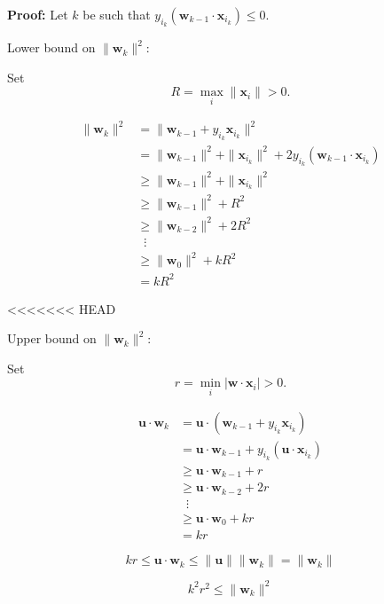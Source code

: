 \documentclass{beamer}
\newcommand{\vu}{\boldsymbol{u}}
\newcommand{\vw}{\boldsymbol{w}}
\newcommand{\vx}{\boldsymbol{x}}
\begin{document}
\begin{frame}{}
    \textbf{Proof:} Let $k$ be such that $y_{i_k}(\vw_{k-1}\cdot\vx_{i_k})\leq 0$.

    Lower bound on $\|\vw_k\|^2$:

    Set
    \[
        R = \max_i\|\vx_i\|>0.
    \]

    \vspace{-2em}\begin{align*}
        \|\vw_k\|^2 &= \|\vw_{k-1} + y_{i_k}\vx_{i_k}\|^2\\
        &= \|\vw_{k-1}\|^2 + \|\vx_{i_k}\|^2 + 2y_{i_k}(\vw_{k-1}\cdot\vx_{i_k})\\
        &\geq \|\vw_{k-1}\|^2 + \|\vx_{i_k}\|^2\\
        &\geq \|\vw_{k-1}\|^2 + R^2\\
        &\geq \|\vw_{k-2}\|^2 + 2R^2\\
        &\;\;\vdots\\
        &\geq \|\vw_0\|^2 + kR^2\\
        &= kR^2
    \end{align*}
\end{frame}

<<<<<<< HEAD
\begin{frame}{}
    Upper bound on $\|\vw_k\|^2$:
 
    Set
    \[
        r = \min_i |\vw\cdot \vx_i|>0.
    \]

    \vspace{-2em}\begin{align*}
        \vu\cdot \vw_k &= \vu\cdot(\vw_{k-1} + y_{i_k}\vx_{i_k})\\
        &= \vu\cdot \vw_{k-1} + y_{i_k}(\vu\cdot \vx_{i_k})\\
        &\geq \vu\cdot \vw_{k-1} + r\\
        &\geq \vu\cdot \vw_{k-2} + 2r\\
        &\;\;\vdots\\
        &\geq \vu\cdot\vw_0 + kr\\
        &= kr
    \end{align*}

    \vspace{-2em}\[
        kr\leq \vu\cdot\vw_k\leq \|\vu\|\|\vw_k\| = \|\vw_k\|
    \]

    \vspace{-2em}\[
        k^2r^2\leq \|\vw_k\|^2
    \]
\end{frame}

\end{document}
